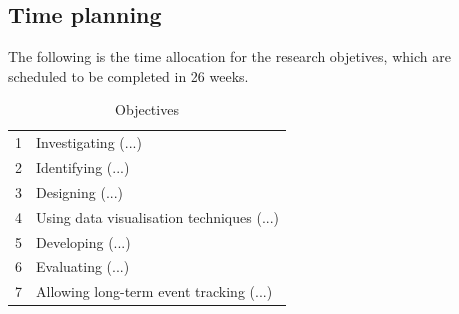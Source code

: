 \subsection{Time planning}


The following is the time allocation for the research objetives, 
which are scheduled to be completed in 26 weeks. \\

\begin{table}[h]
  \begin{center}
    \begin{tabular}{ p{} p{} }
      \cellcolor[rgb]{0.94,0.96,0.98}1 & Investigating (...) \\
      \cellcolor[rgb]{0.86,0.90,0.96}2 & Identifying (...) \\ 
      \cellcolor[rgb]{0.78,0.84,0.94}3 & Designing (...) \\
      \cellcolor[rgb]{0.71,0.78,0.92}4 & Using data visualisation techniques (...) \\
      \cellcolor[rgb]{0.63,0.73,0.89}5 & Developing (...) \\
      \cellcolor[rgb]{0.55,0.67,0.87}6 & Evaluating (...) \\
      \cellcolor[rgb]{0.47,0.61,0.85}7 & Allowing long-term event tracking (...) \\
    \end{tabular}
    \caption{Objectives}
    \label{tab:objectives}
  \end{center}
\end{table}

